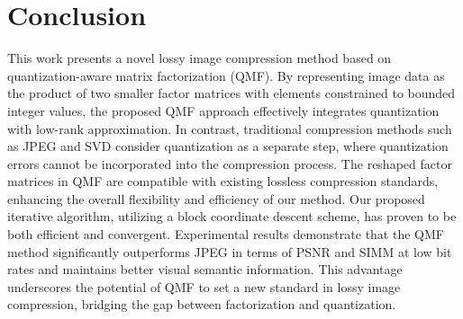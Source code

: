\section{Conclusion} \label{sec:conclusion}

This work presents a novel lossy image compression method based on quantization-aware matrix factorization (QMF). By representing image data as the product of two smaller factor matrices with elements constrained to bounded integer values, the proposed QMF approach effectively integrates quantization with low-rank approximation. In contrast, traditional compression methods such as JPEG and SVD consider quantization as a separate step, where quantization errors cannot be incorporated into the compression process. The reshaped factor matrices in QMF are compatible with existing lossless compression standards, enhancing the overall flexibility and efficiency of our method. Our proposed iterative algorithm, utilizing a block coordinate descent scheme, has proven to be both efficient and convergent. Experimental results demonstrate that the QMF method significantly outperforms JPEG in terms of PSNR and SIMM at low bit rates and maintains better visual semantic information. This advantage underscores the potential of QMF to set a new standard in lossy image compression, bridging the gap between factorization and quantization.

